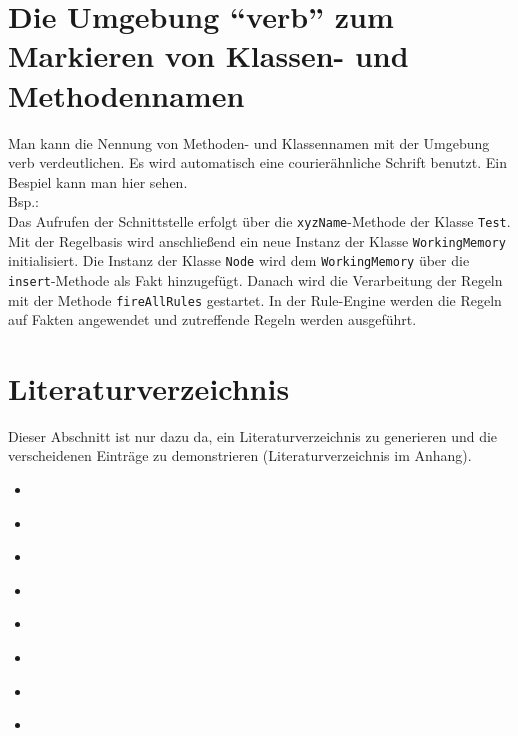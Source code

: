 




\section{Die Umgebung "`verb"' zum Markieren von Klassen- und Methodennamen}
Man kann die Nennung von Methoden- und Klassennamen mit der Umgebung verb verdeutlichen. Es wird automatisch eine courierähnliche Schrift benutzt. Ein Bespiel kann man hier sehen. \\

Bsp.:\\
Das Aufrufen der Schnittstelle erfolgt über die \verb|xyzName|-Methode der Klasse \verb|Test|. Mit der Regelbasis wird anschließend ein neue Instanz der Klasse \verb|WorkingMemory| initialisiert. Die Instanz der Klasse \verb|Node| wird dem \verb|WorkingMemory| über die \verb|insert|-Methode als Fakt hinzugefügt. Danach wird die Verarbeitung der Regeln mit der Methode \verb|fireAllRules| gestartet. In der Rule-Engine werden die Regeln auf Fakten angewendet und zutreffende Regeln werden ausgeführt. 

\section{Literaturverzeichnis}
Dieser Abschnitt ist nur dazu da, ein Literaturverzeichnis zu generieren und die verscheidenen Einträge zu demonstrieren (\vgl Literaturverzeichnis im Anhang).
\begin{itemize}
	\item \cite[\vgl][]{workflowcoalation:2008}
	\item \cite[\vgl][]{omg:2008}
	\item \cite[\vgl][]{drools:2007}
	\item \cite[\vgl][]{Itil:2008}
	\item \cite[\vgl][]{Doorenbos:1994}
	\item \cite[\vgl][]{beck:2005}
	\item \cite[\vgl][]{vanBerg:2006}
	\item \cite[\vgl][]{WrightMarshall:2000}
\end{itemize}
